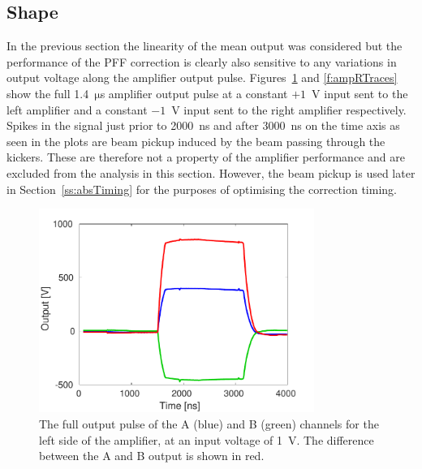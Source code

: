 \subsection{Shape}
\label{ss:ampShape}

In the previous section the linearity of the mean output was considered but the performance of the PFF correction is clearly also sensitive to any variations in output voltage along the amplifier output pulse. Figures~\ref{f:ampLTraces} and \ref{f:ampRTraces} show the full 1.4~\(\mathrm{\mu}\)s amplifier output pulse at a constant \(+1\)~V input sent to the left amplifier and a constant \(-1\)~V input sent to the right amplifier respectively. Spikes in the signal just prior to 2000~ns and after 3000~ns on the time axis as seen in the plots are beam pickup induced by the beam passing through the kickers. These are therefore not a property of the amplifier performance and are excluded from the analysis in this section. However, the beam pickup is used later in Section~\ref{ss:absTiming} for the purposes of optimising the correction timing.

\begin{figure}
  \centering
  \includegraphics[width=0.8\textwidth]{Figures/commissioning/AmpL_Traces}
  \caption{The full output pulse of the A (blue) and B (green) channels for the left side of the amplifier, at an input voltage of 1~V. The difference between the A and B output is shown in red.}
  \label{f:ampLTraces}
\end{figure}

